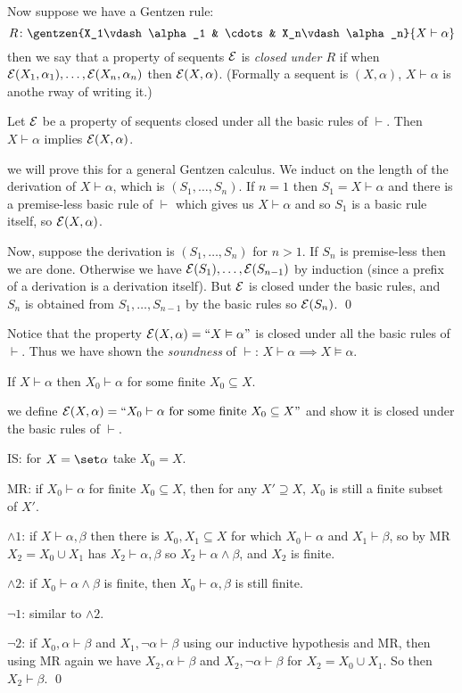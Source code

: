 Now suppose we have a Gentzen rule:
$$ R\colon \gentzen{X_1\vdash\alpha_1 & \cdots & X_n\vdash\alpha_n}{X\vdash\alpha} $$
then we say that a property of sequents ${\cal E}$ is {\it closed under $R$} if when
${\cal E}(X_1,\alpha_1),\dots,{\cal E}(X_n,\alpha_n)$ then ${\cal E}(X,\alpha)$.
(Formally a sequent is $(X,\alpha)$, $X\vdash\alpha$ is anothe rway of writing it.)

\blemm[title=Principle of Rule Induction]

    Let ${\cal E}$ be a property of sequents closed under all the basic rules of $\vdash$.
    Then $X\vdash\alpha$ implies ${\cal E}(X,\alpha)$.

\elemm

\Proof we will prove this for a general Gentzen calculus.
We induct on the length of the derivation of $X\vdash\alpha$, which is $(S_1,\dots,S_n)$.
If $n=1$ then $S_1=X\vdash\alpha$ and there is a premise-less basic rule of $\vdash$ which gives
us $X\vdash\alpha$ and so $S_1$ is a basic rule itself, so ${\cal E}(X,\alpha)$.

Now, suppose the derivation is $(S_1,\dots,S_n)$ for $n>1$.
If $S_n$ is premise-less then we are done.
Otherwise we have ${\cal E}(S_1),\dots,{\cal E}(S_{n-1})$ by induction (since a prefix of a derivation is a
derivation itself).
But ${\cal E}$ is closed under the basic rules, and $S_n$ is obtained from $S_1,\dots,S_{n-1}$ by the
basic rules so ${\cal E}(S_n)$.
\qed

Notice that the property ${\cal E}(X,\alpha)=\hbox{``$X\vDash\alpha$''}$ is closed under all the basic rules
of $\vdash$.
Thus we have shown the {\it soundness} of $\vdash$: $X\vdash\alpha\implies X\vDash\alpha$.

\bthrm[title=Finiteness of $\vdash$]

    If $X\vdash\alpha$ then $X_0\vdash\alpha$ for some finite $X_0\subseteq X$.

\ethrm

\Proof we define ${\cal E}(X,\alpha)=\hbox{``$X_0\vdash\alpha\hbox{ for some finite $X_0\subseteq X$}$''}$
and show it is closed under the basic rules of $\vdash$.
\benum
    \item IS: for $X=\set\alpha$ take $X_0=X$.
    \item MR: if $X_0\vdash\alpha$ for finite $X_0\subseteq X$, then for any $X'\supseteq X$,
    $X_0$ is still a finite subset of $X'$.
    \item $\land1$: if $X\vdash\alpha,\beta$ then there is $X_0,X_1\subseteq X$ for which
    $X_0\vdash\alpha$ and $X_1\vdash\beta$, so by MR $X_2=X_0\cup X_1$ has $X_2\vdash\alpha,\beta$
    so $X_2\vdash\alpha\land\beta$, and $X_2$ is finite.
    \item $\land2$: if $X_0\vdash\alpha\land\beta$ is finite, then $X_0\vdash\alpha,\beta$ is
    still finite.
    \item $\neg1$: similar to $\land2$.
    \item $\neg2$: if $X_0,\alpha\vdash\beta$ and $X_1,\neg\alpha\vdash\beta$ using our
    inductive hypothesis and MR, then using MR again we have $X_2,\alpha\vdash\beta$ and
    $X_2,\neg\alpha\vdash\beta$ for $X_2=X_0\cup X_1$.
    So then $X_2\vdash\beta$.
    \qed
\eenum

